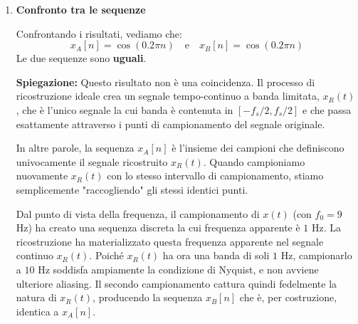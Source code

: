\begin{soluzione}{20}
\begin{enumerate}
        \item \textbf{Confronto tra le sequenze}
        
        Confrontando i risultati, vediamo che:
        \[
            x_A[n] = \cos(0.2\pi n) \quad \text{e} \quad x_B[n] = \cos(0.2\pi n)
        \]
        Le due sequenze sono \textbf{uguali}.
        
        \textbf{Spiegazione:} Questo risultato non è una coincidenza. Il processo di ricostruzione ideale crea un segnale tempo-continuo a banda limitata, $x_R(t)$, che è l'unico segnale la cui banda è contenuta in $[-f_s/2, f_s/2]$ e che passa esattamente attraverso i punti di campionamento del segnale originale.
        
        In altre parole, la sequenza $x_A[n]$ è l'insieme dei campioni che definiscono univocamente il segnale ricostruito $x_R(t)$. Quando campioniamo nuovamente $x_R(t)$ con lo stesso intervallo di campionamento, stiamo semplicemente "raccogliendo" gli stessi identici punti.
        
        Dal punto di vista della frequenza, il campionamento di $x(t)$ (con $f_0=9$ Hz) ha creato una sequenza discreta la cui frequenza apparente è $1$ Hz. La ricostruzione ha materializzato questa frequenza apparente nel segnale continuo $x_R(t)$. Poiché $x_R(t)$ ha ora una banda di soli $1$ Hz, campionarlo a $10$ Hz soddisfa ampiamente la condizione di Nyquist, e non avviene ulteriore aliasing. Il secondo campionamento cattura quindi fedelmente la natura di $x_R(t)$, producendo la sequenza $x_B[n]$ che è, per costruzione, identica a $x_A[n]$.
        
    \end{enumerate}
\end{soluzione}